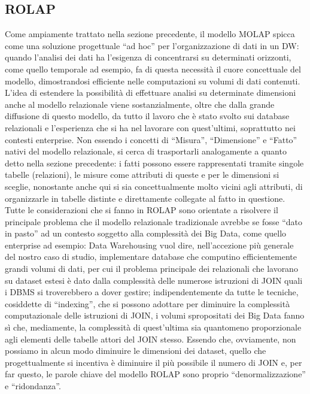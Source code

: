 \documentclass[a4paper,12pt]{report}
\begin{document}
\subsection{ROLAP}
Come ampiamente trattato nella sezione precedente, il modello MOLAP spicca come una soluzione progettuale “ad hoc” per l’organizzazione di dati in un DW: quando l’analisi dei dati ha l’esigenza di concentrarsi su determinati orizzonti, come quello temporale ad esempio, fa di questa necessità il cuore concettuale del modello, dimostrandosi efficiente nelle computazioni su volumi di dati contenuti. L’idea di estendere la possibilità di effettuare analisi su determinate dimensioni anche al modello relazionale viene sostanzialmente, oltre che dalla grande diffusione di questo modello, da tutto il lavoro che è stato svolto sui database relazionali e l’esperienza che si ha nel lavorare con quest’ultimi, soprattutto nei contesti enterprise. Non essendo i concetti di “Misura”, “Dimensione” e “Fatto” nativi del modello relazionale, si cerca di trasportarli analogamente a quanto detto nella sezione precedente: i fatti possono essere rappresentati tramite singole tabelle (relazioni), le misure come attributi di queste e per le dimensioni si sceglie, nonostante anche qui si sia concettualmente molto vicini agli attributi, di organizzarle in tabelle distinte e direttamente collegate al fatto in questione. Tutte le considerazioni che si fanno in ROLAP sono orientate a risolvere il principale problema che il modello relazionale tradizionale avrebbe se fosse “dato in pasto” ad un contesto soggetto alla complessità dei Big Data, come quello enterprise ad esempio: Data Warehousing vuol dire, nell’accezione più generale del nostro caso di studio, implementare database che computino efficientemente grandi volumi di dati, per cui il problema principale dei relazionali che lavorano su dataset estesi è dato dalla complessità delle numerose istruzioni di JOIN quali i DBMS si troverebbero a dover gestire; indipendentemente da tutte le tecniche, cosiddette di “indexing”, che si possono adottare per diminuire la complessità computazionale delle istruzioni di JOIN, i volumi spropositati dei Big Data fanno sì che, mediamente, la complessità di quest’ultima sia quantomeno proporzionale agli elementi delle tabelle attori del JOIN stesso. Essendo che, ovviamente, non possiamo in alcun modo diminuire le dimensioni dei dataset, quello che progettualmente si incentiva è diminuire il più possibile il numero di JOIN e, per far questo, le parole chiave del modello ROLAP sono proprio “denormalizzazione” e “ridondanza”.
\end{document}
